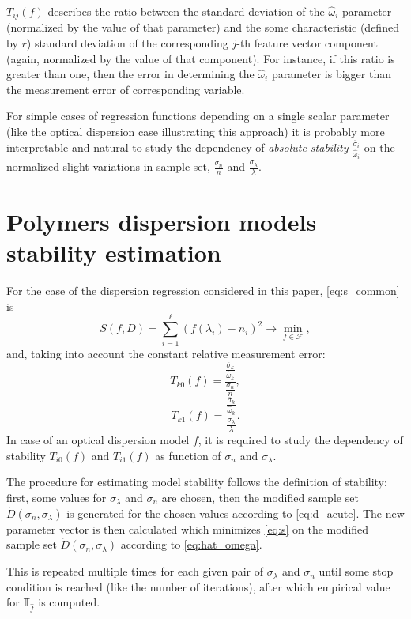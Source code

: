 \documentclass[11pt,a4paper]{article}
\theoremstyle{definition}
\begin{document}
$T_{ij}(f)$ describes the ratio between the standard deviation of the $\hat{\omega}_i$ parameter
(normalized by the value of that parameter) and the some characteristic (defined by $r$)
standard deviation of the corresponding $j$-th feature vector component (again, normalized by
the value of that component).
For instance, if this ratio is greater than one, then the error in determining the $\hat{\omega}_i$
parameter is bigger than the measurement error of corresponding variable.

For simple cases of regression functions depending on a single scalar parameter (like the optical
dispersion case illustrating this approach) it is probably more interpretable and natural to study the
dependency of \emph{absolute stability} $\frac{\overline{\sigma}_i}{\hat{\omega}_i}$ on the
normalized slight variations in sample set, $\frac{\sigma_n}{n}$ and $\frac{\sigma_{\lambda}}{\lambda}$.

\section{Polymers dispersion models stability estimation}

For the case of the dispersion regression considered in this paper, \eqref{eq:s_common}
is
\begin{equation}
  S(f, D) = \sum_{i = 1}^\ell (f(\lambda_i) - n_i)^2 \rightarrow \min_{f \in \mathcal{F}},
  \label{eq:s}
\end{equation}
and, taking into account the constant relative measurement error:
\[
  T_{k0}(f) = \frac{\frac{\overline{\sigma}_k}{\hat{\omega}_k}}{\frac{\sigma_n}{n}},
\]
\[
  T_{k1}(f) = \frac{\frac{\overline{\sigma}_k}{\hat{\omega}_k}}{\frac{\sigma_{\lambda}}{\lambda}}.
\]
In case of an optical dispersion model $f$, it is required to study the
dependency of stability $T_{i0}(f)$ and $T_{i1}(f)$ as function of
$\sigma_n$ and $\sigma_{\lambda}$.

The procedure for estimating model stability follows the definition of stability:
first, some values for $\sigma_{\lambda}$ and $\sigma_n$ are chosen,
then the modified sample set $\acute{D}(\sigma_n, \sigma_{\lambda})$ is
generated for the chosen values according to \eqref{eq:d_acute}. The new
parameter vector is then calculated which minimizes \eqref{eq:s} on the
modified sample set $\acute{D}(\sigma_n, \sigma_{\lambda})$ according to
\eqref{eq:hat_omega}.

This is repeated multiple times for each given pair of $\sigma_{\lambda}$ and $\sigma_n$
until some stop condition is reached (like the number of iterations), after which
empirical value for $\mathbb{T}_{\hat{f}}$ is computed.
\end{document}
